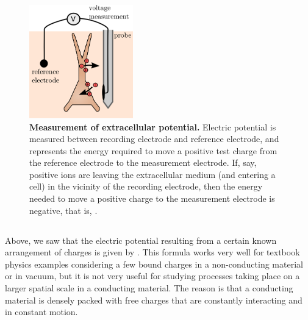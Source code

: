 \begin{figure}[!ht]
\begin{center}
\includegraphics[width=0.4\textwidth]{Figures/Basics/rec_elec_circuit.png}
\end{center}
\caption[]{\textbf{Measurement of extracellular potential.}
Electric potential is measured between recording electrode and reference electrode, and represents the energy required to move a positive test charge from the reference electrode to the measurement electrode. If, say, positive ions are leaving the extracellular medium (and entering a cell) in the vicinity of the recording electrode, then the energy needed to move a positive charge to the measurement electrode is negative, that is, .}
\label{fig:Basics:elec_circuit}
\end{figure}

 
 

\subsection{}
\label{sec:Basics:Debye}
Above, we saw that the electric potential resulting from a certain known arrangement of charges is given by . This formula works very well for textbook physics examples considering a few bound charges in a non-conducting material or in vacuum, but it is not very useful for studying processes taking place on a larger spatial scale in a conducting material. The reason is that a conducting material is densely packed with free charges that are constantly interacting and in constant motion. 

